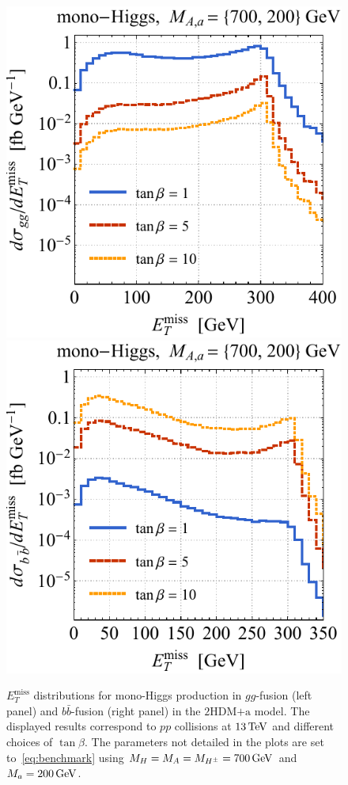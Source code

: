 \documentclass[a4paper, 11pt,notoc]{article}
\newcommand{\MET}{\ensuremath{E_T^\mathrm{miss}}\xspace}
\newcommand{\mA}{\ensuremath{M_{A}}\xspace}
\newcommand{\ma}{\ensuremath{M_{a}}\xspace}
\newcommand{\mH}{\ensuremath{M_{H}}\xspace}
\newcommand{\mHc}{\ensuremath{M_{H^{\pm}}}\xspace}
\newcommand{\hdma}{\ensuremath{\textrm{2HDM+a}}\xspace}
\begin{document}
\begin{figure}[t!]
\centering
\includegraphics[height=0.45\textwidth]{tblh.pdf} \qquad 
\includegraphics[height=0.45\textwidth]{tbrh.pdf}
\vspace{2mm}
\caption{\label{fig:tbvar1} 
$\MET$ distributions for mono-Higgs production in $gg$-fusion (left panel) and $b \bar b$-fusion (right panel) in the \hdma model. The displayed results correspond to $pp$ collisions at  $13 \, {\rm TeV}$ and different choices of $\tan \beta$. The parameters not detailed in the plots are set to~\eqref{eq:benchmark} using $\mH = \mA = \mHc = 700 \, {\rm GeV}$ and $\ma = 200 \, {\rm GeV}$.}
\end{figure}
\end{document}
